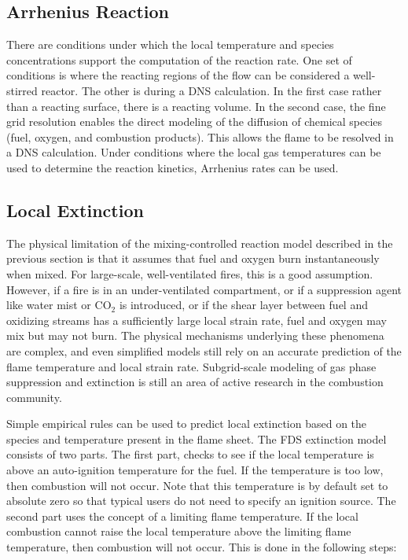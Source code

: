\subsection{Arrhenius Reaction}
There are conditions under which the local temperature and species concentrations support the computation of the reaction rate.  One set of conditions is where the reacting regions of the flow can be considered a well-stirred reactor.  The other is during a DNS calculation.  In the first case rather than a reacting surface, there is a reacting volume.  In the second case, the fine grid resolution enables the direct modeling of the diffusion of chemical species (fuel,
oxygen, and combustion products).  This allows the flame to be resolved in a DNS calculation.  Under conditions where the local gas
temperatures can be used to determine the reaction kinetics, Arrhenius rates can be used.


\subsection{Local Extinction}

\label{extinction}

The physical limitation of the mixing-controlled reaction model described in the previous section is that it assumes that fuel and oxygen burn instantaneously when mixed. For large-scale, well-ventilated
fires, this is a good assumption. However, if a fire is in an
under-ventilated compartment, or if a suppression agent like water
mist or CO$_2$ is introduced, or if the shear layer between fuel and oxidizing streams
has a sufficiently large local strain rate,
fuel and oxygen may mix but may not burn.
The physical mechanisms underlying these phenomena are complex, and
even simplified models still rely on an accurate prediction
of the flame temperature and local strain rate.
Subgrid-scale modeling of gas phase suppression and
extinction is still an area of active research in the combustion
community.

Simple empirical rules can be used to predict local
extinction based on the species and temperature present in the flame sheet.  The FDS extinction model consists of two parts. The first part, checks to see if the local temperature is above an auto-ignition temperature for the fuel.  If the temperature is too low, then combustion will not occur.  Note that this temperature is by default set to absolute zero so that typical users do not need to specify an ignition source.  The second part uses the concept of a limiting flame temperature.  If the local combustion cannot raise the local temperature above the limiting flame temperature, then combustion will not occur.  This is done in the following steps:

